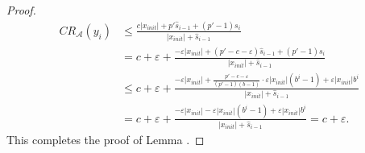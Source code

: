 \begin{appendixonly}
\begin{proof}
    \begin{align*}
        CR_{\mathcal{A}}(y_i) &\leq \frac{c|x_{init}| + p'\hat{s}_{i-1} + (p'-1)s_i}{|x_{init}|+\hat{s}_{i-1}} \\
        &= c + \varepsilon + \frac{-\varepsilon |x_{init}| + (p'-c-\varepsilon)\hat{s}_{i-1} + (p'-1)s_i}{|x_{init}|+\hat{s}_{i-1}} \\
        &\leq c + \varepsilon + \frac{-\varepsilon |x_{init}| + \frac{p'-c-\varepsilon}{(p'-1)(b-1)}\cdot\varepsilon |x_{init}|(b^{i}-1) + \varepsilon |x_{init}|b^i}{|x_{init}|+\hat{s}_{i-1}} \\
        &= c + \varepsilon + \frac{-\varepsilon |x_{init}| - \varepsilon |x_{init}|(b^{i}-1) + \varepsilon |x_{init}|b^i}{|x_{init}|+\hat{s}_{i-1}} = c + \varepsilon .
    \end{align*}
    This completes the proof of Lemma .
\end{proof}
\end{appendixonly}

